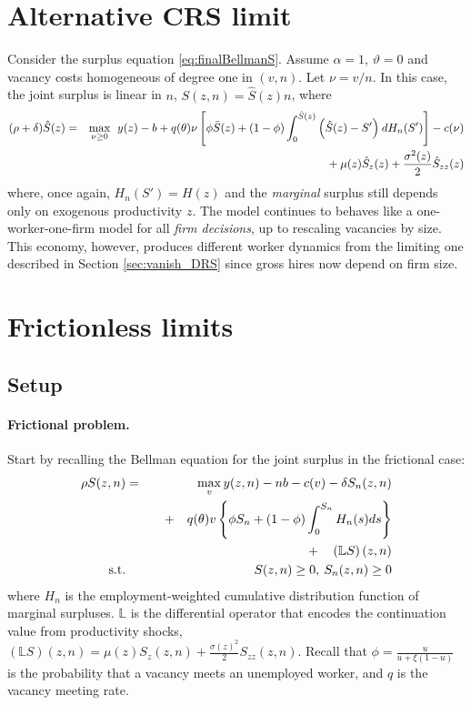 \section{Alternative CRS limit}
\label{appx:CRS_limit}
Consider the surplus equation \eqref{eq:finalBellmanS}. Assume $\alpha=1$, $\vartheta=0$ and vacancy costs homogeneous of degree one in $(v,n)$. Let $\nu=v/n$. In this case, the joint surplus is linear in $n$, $S(z,n) = \hat{S}(z)n$, where
\begin{eqnarray}
\label{eq:liserobin2}
(\rho+\delta) \hat{S}(z) &=& \max_{\nu\geq0}\:\: y(z) - b + q(\theta)\nu\left[\phi \bar{S}(z) +
(1-\phi)\int_0^{\hat{S}(z)} \Big(\hat{S}(z)-S^\prime\Big)\:dH_n(S^\prime)\right] -
c(\nu) \\
&&\quad\quad\quad+\:\mu(z)\hat{S}_z(z)+\frac{\sigma^2(z)}{2}\hat{S}_{zz}(z) \notag
\vspace*{-.3cm}
\end{eqnarray}
where, once again, $H_n(S') = H(z)$ and the \textit{marginal} surplus still depends only on exogenous productivity $z$. The model continues to behaves like a one-worker-one-firm model for all \textit{firm decisions}, up to rescaling vacancies by size. This economy, however, produces different worker dynamics from the limiting one described in Section \ref{sec:vanish_DRS} since gross hires now depend on firm size.

\section{Frictionless limits \label{app:hopehnayn}}

\label{appx:limiting_economies}

\subsection{Setup}

\paragraph{Frictional problem.}

Start by recalling the Bellman equation for the joint surplus in the frictional case:
\begin{eqnarray}\label{eq:AppEBellman}
\rho S(z,n) &=& \max_v y(z,n) - n b - c(v) -\delta S_n(z,n) \\
&&\quad + \quad q(\theta) v \left\{ \phi S_n + (1-\phi) \int_0^{S_n} H_n(s)ds\right\} \notag \\
&&\quad + \quad \left(\mathbb{L} S \right)(z,n) \notag  \\
\text{s.t.} && S(z,n) \geq 0  ,\:  S_n(z,n) \geq 0 \notag
\end{eqnarray}
where $H_n$ is the employment-weighted cumulative distribution function of marginal surpluses. $\mathbb{L}$ is the differential operator that encodes the continuation value from productivity shocks, $\left(\mathbb{L} S \right)(z,n) = \mu(z) S_z(z,n) + \frac{\sigma(z)^2}{2} S_{zz}(z,n)$. 
Recall that $\phi = \frac{u}{u + \xi (1-u)}$ is the probability that a vacancy meets an unemployed worker, and $q$ is the vacancy meeting rate.

